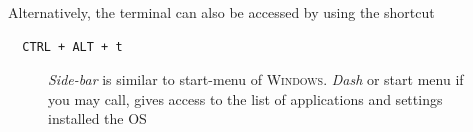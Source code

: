 \documentclass{tufte-book} %
\begin{document}
Alternatively, the terminal can also be accessed by using the shortcut
\begin{verbatim}
  CTRL + ALT + t
\end{verbatim}

\begin{figure}[p]
  
 \vspace{\baselineskip}
  \caption[Appearance of Ubuntu Desktop]{\emph{Side-bar} is similar to start-menu of \textsc{Windows}. \emph{Dash} or start menu if you may call, gives access to the list of applications and settings installed the OS}

\end{figure}
\end{document}
